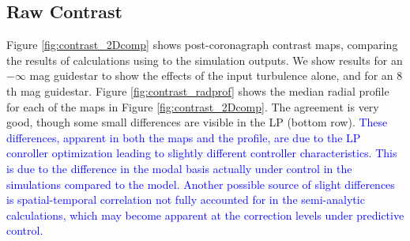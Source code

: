 \documentclass[10pt,preprint]{aastex631}
\newcommand{\jrmadd}[1]{\textcolor{blue}{#1}}
\begin{document}
\subsection{Raw Contrast}
Figure \ref{fig:contrast_2Dcomp} shows post-coronagraph contrast maps, comparing the results of calculations using \citet{2018JATIS...4a9001M} to the simulation outputs.  We show results for an $-\infty$ mag guidestar to show the effects of the input turbulence alone, and for an $8$th mag guidestar.   Figure \ref{fig:contrast_radprof} shows the median radial profile for each of the maps in Figure \ref{fig:contrast_2Dcomp}.  The agreement is very good, though some small differences are visible in the LP (bottom row). \jrmadd{These differences, apparent in both the maps and the profile, are due to the LP conroller optimization leading to slightly different controller characteristics.  This is due to the difference in the modal basis actually under control in the simulations compared to the model. Another possible source of slight differences is spatial-temporal correlation not fully accounted for in the semi-analytic calculations, which may become apparent at the correction levels under predictive control.}
\end{document}
